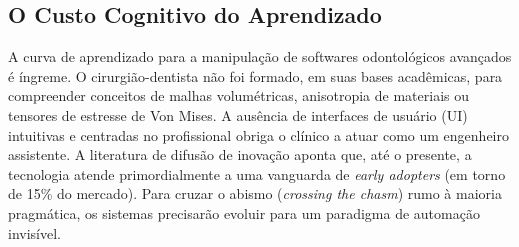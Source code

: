 \subsection{O Custo Cognitivo do Aprendizado}

A curva de aprendizado para a manipulação de softwares odontológicos avançados é íngreme. O cirurgião-dentista não foi formado, em suas bases acadêmicas, para compreender conceitos de malhas volumétricas, anisotropia de materiais ou tensores de estresse de Von Mises. A ausência de interfaces de usuário (UI) intuitivas e centradas no profissional obriga o clínico a atuar como um engenheiro assistente. A literatura de difusão de inovação aponta que, até o presente, a tecnologia atende primordialmente a uma vanguarda de \textit{early adopters} (em torno de 15\% do mercado). Para cruzar o abismo (\textit{crossing the chasm}) rumo à maioria pragmática, os sistemas precisarão evoluir para um paradigma de automação invisível.

